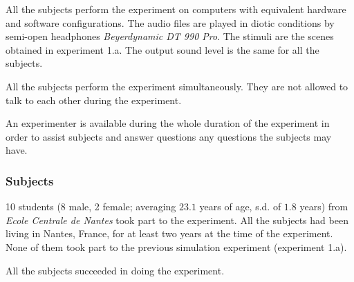 \documentclass[12pt]{elsarticle}
\begin{document}

All the subjects perform the experiment on computers with equivalent hardware and software configurations. The audio files are played in diotic conditions by semi-open headphones \emph{Beyerdynamic DT 990 Pro}. The stimuli are the scenes obtained in experiment 1.a. The output sound level is the same for all the subjects.


All the subjects perform the experiment simultaneously. They are not allowed to talk to each other during the experiment.


An experimenter is available during the whole duration of the experiment in order to assist subjects and answer questions any questions the subjects may have.

\subsubsection*{Subjects}


10 students (8 male, 2 female; averaging $23.1$ years of age, s.d. of $1.8$ years) from \emph{Ecole Centrale de Nantes} took part to the experiment. All the subjects had been living in Nantes, France, for at least two years at the time of the experiment. None of them took part to the previous simulation experiment (experiment 1.a).


All the subjects succeeded in doing the experiment.
\end{document}

